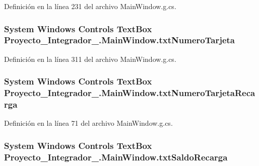 Definición en la línea 231 del archivo Main\-Window.\-g.\-cs.

\hypertarget{class_proyecto___integrador__3_1_1_main_window_aa002c65e1d03d58932cae92c7523198a}{
\subsubsection[{txt\-Numero\-Tarjeta}]{\setlength{\rightskip}{0pt plus 5cm}System Windows Controls Text\-Box Proyecto\-\_\-\-Integrador\-\_.\-Main\-Window.\-txt\-Numero\-Tarjeta\hspace{0.3cm}{\ttfamily [package]}}}\label{class_proyecto___integrador__3_1_1_main_window_aa002c65e1d03d58932cae92c7523198a}


Definición en la línea 311 del archivo Main\-Window.\-g.\-cs.

\hypertarget{class_proyecto___integrador__3_1_1_main_window_a921e64f5a9f1531f12802b32f06bf71b}{
\subsubsection[{txt\-Numero\-Tarjeta\-Recarga}]{\setlength{\rightskip}{0pt plus 5cm}System Windows Controls Text\-Box Proyecto\-\_\-\-Integrador\-\_.\-Main\-Window.\-txt\-Numero\-Tarjeta\-Recarga\hspace{0.3cm}{\ttfamily [package]}}}\label{class_proyecto___integrador__3_1_1_main_window_a921e64f5a9f1531f12802b32f06bf71b}


Definición en la línea 71 del archivo Main\-Window.\-g.\-cs.

\hypertarget{class_proyecto___integrador__3_1_1_main_window_aeb68364159bb1ed1dbf417a205fd3519}{
\subsubsection[{txt\-Saldo\-Recarga}]{\setlength{\rightskip}{0pt plus 5cm}System Windows Controls Text\-Box Proyecto\-\_\-\-Integrador\-\_.\-Main\-Window.\-txt\-Saldo\-Recarga\hspace{0.3cm}{\ttfamily [package]}}}\label{class_proyecto___integrador__3_1_1_main_window_aeb68364159bb1ed1dbf417a205fd3519}


